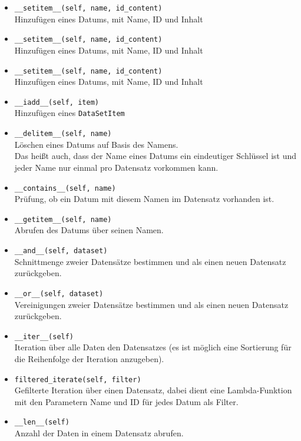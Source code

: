 \documentclass[]{article}
\begin{document}
\begin{itemize}
    \setlength\itemsep{0em}
    \item \texttt{\_\_setitem\_\_(self, name, id\_content)}\\
    Hinzufügen eines Datums, mit Name, ID und Inhalt
    \item \texttt{\_\_setitem\_\_(self, name, id\_content)}\\
    Hinzufügen eines Datums, mit Name, ID und Inhalt
    \item \texttt{\_\_setitem\_\_(self, name, id\_content)}\\
    Hinzufügen eines Datums, mit Name, ID und Inhalt
    \item \texttt{\_\_iadd\_\_(self, item)}\\
    Hinzufügen eines \texttt{DataSetItem}
    \item \texttt{\_\_delitem\_\_(self, name)}\\
    Löschen eines Datums auf Basis des Namens.\\
    Das heißt auch, dass der Name eines Datums ein eindeutiger Schlüssel ist und jeder Name nur einmal pro Datensatz vorkommen kann.
    \item \texttt{\_\_contains\_\_(self, name)}\\
    Prüfung, ob ein Datum mit diesem Namen im Datensatz vorhanden ist.
    \item \texttt{\_\_getitem\_\_(self, name)}\\
    Abrufen des Datums über seinen Namen.
    \item \texttt{\_\_and\_\_(self, dataset)}\\
    Schnittmenge zweier Datensätze bestimmen und als einen neuen Datensatz zurückgeben.
    \item \texttt{\_\_or\_\_(self, dataset)}\\
    Vereinigungen zweier Datensätze bestimmen und als einen neuen Datensatz zurückgeben.
    \item \texttt{\_\_iter\_\_(self)}\\
    Iteration über alle Daten den Datensatzes (es ist möglich eine Sortierung für die Reihenfolge der Iteration anzugeben).
    \item \texttt{filtered\_iterate(self, filter)}\\
    Gefilterte Iteration über einen Datensatz, dabei dient eine Lambda-Funktion mit den Parametern Name und ID für jedes Datum als Filter.
    \item \texttt{\_\_len\_\_(self)}\\
    Anzahl der Daten in einem Datensatz abrufen.
\end{itemize}
\end{document}
